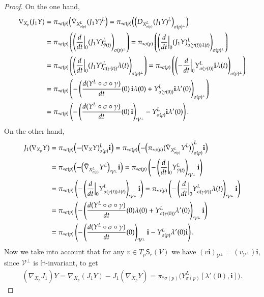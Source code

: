 \documentclass[12pt, a4paper,draft]{amsart}
\renewcommand{\H}{\mathbb{H}}
\theoremstyle{remark}
\begin{document}
\begin{proof}
On the one hand,
\[
\begin{aligned}
\nabla_{X_p}(J_1 Y)
&{}=\pi_{*\sigma(p)}\Bigl(\tilde{\nabla}_{X_{\sigma(p)}^L}(J_1 Y)^L\Bigr)
=\pi_{*\sigma(p)}\Bigl(\Bigl(D_{X_{\sigma(p)}^L}(J_1 Y)^L\Bigr)_{\sigma(p)^\perp}\Bigr)\\
&{}=\pi_{*\sigma(p)}\left(
\left(\frac{d}{dt}\Big\vert_0 (J_1 Y)_{\tilde{\gamma}(t)}^L\right)_{\sigma(p)^\perp}\right)
=\pi_{*\sigma(p)}\left(
\left(\frac{d}{dt}\Big\vert_0 (J_1 Y)_{\sigma(\gamma(t))\lambda(t)}^L\right)_{\sigma(p)^\perp}\right)\\
&{}=\pi_{*\sigma(p)}\left(
\left(\frac{d}{dt}\Big\vert_0 (J_1 Y)_{\sigma(\gamma(t))}^L\lambda(t)\right)_{\sigma(p)^\perp}\right)
=\pi_{*\sigma(p)}\left(
\left(-\frac{d}{dt}\Big\vert_0 Y_{\sigma(\gamma(t))}^L\mathbf{i}\lambda(t)\right)_{\sigma(p)^\perp}\right)\\
&{}=\pi_{*\sigma(p)}\left(
-\left(\frac{d(Y^L\circ\sigma\circ\gamma)}{dt}(0)\,\mathbf{i}\lambda(0) +Y_{\sigma(\gamma(0))}^L\mathbf{i}\lambda'(0)\right)_{\sigma(p)^\perp}\right)\\
&{}=\pi_{*\sigma(p)}\left(
-\left(\frac{d(Y^L\circ\sigma\circ\gamma)}{dt}(0)\,\mathbf{i}\right)_{\mathcal{V}^\perp} -Y_{\sigma(p)}^L\mathbf{i}\lambda'(0)\right).
\end{aligned}
\]
On the other hand,
\[
\begin{aligned}
J_1(\nabla_{X_p}Y)
&{}=\pi_{*\sigma(p)}\Bigl(-(\nabla_X Y)_{\sigma(p)}^L\mathbf{i}\Bigr)
=\pi_{*\sigma(p)}\Bigl(
-\Bigl(\pi_{*\sigma(p)}(\tilde{\nabla}_{X_{\sigma(p)}^L} Y^L)\Bigr)_{\sigma(p)}^L\mathbf{i}\Bigr)\\
&{}=\pi_{*\sigma(p)}\Bigl(
-\Bigl(\tilde{\nabla}_{X_{\sigma(p)}^L} Y^L\Bigr)_{\mathcal{V}^\perp}\mathbf{i}\Bigr)
=\pi_{*\sigma(p)}\left(
-\left(\frac{d}{dt}\Big\vert_0 Y_{\tilde{\gamma}(t)}^L\right)_{\mathcal{V}^\perp}\mathbf{i}\right)\\
&{}=\pi_{*\sigma(p)}\left(
-\left(\frac{d}{dt}\Big\vert_0  Y_{\sigma(\gamma(t))\lambda(t)}^L\right)_{\mathcal{V}^\perp}\mathbf{i}\right)
=\pi_{*\sigma(p)}\left(
-\left(\frac{d}{dt}\Big\vert_0  Y_{\sigma(\gamma(t))}^L\lambda(t)\right)_{\mathcal{V}^\perp}\mathbf{i}\right)\\
&{}=\pi_{*\sigma(p)}\left(
-\left(\frac{d(Y^L\circ\sigma\circ\gamma)}{dt}(0)\lambda(0) +Y_{\sigma(\gamma(0))}^L\lambda'(0)\right)_{\mathcal{V}^\perp}\mathbf{i}\right)\\
&{}=\pi_{*\sigma(p)}\left(
-\left(\frac{d(Y^L\circ\sigma\circ\gamma)}{dt}(0)\right)_{\mathcal{V}^\perp}\mathbf{i} -Y_{\sigma(p)}^L\lambda'(0)\mathbf{i}\right).
\end{aligned}
\]
Now we take into account that for any $v\in T_p\mathsf{S}_r(V)$ we have 
$(v\mathbf{i})_{\mathcal{V}^\perp}=(v_{\mathcal{V}^\perp})\mathbf{i}$, since $\mathcal{V}^\perp$ is $\H$-invariant, to get
\[
\begin{aligned}
(\nabla_{X_p}J_1)Y
=\nabla_{X_p}(J_1 Y)-J_1(\nabla_{X_p}Y)
=\pi_{*\sigma(p)}\bigl(Y_{\sigma(p)}^L[\lambda'(0),\mathbf{i}]\bigr).
\end{aligned}
\]


\end{proof}
\end{document}
